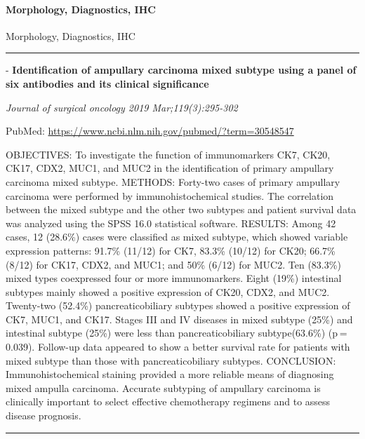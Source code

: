 \documentclass[]{article}
\let\oldparagraph\paragraph
\renewcommand{\paragraph}[1]{\oldparagraph{#1}\mbox{}}
\begin{document}
\hypertarget{morphology-diagnostics-ihc-3}{%
\paragraph{Morphology, Diagnostics,
IHC}\label{morphology-diagnostics-ihc-3}}

Morphology, Diagnostics, IHC

\begin{center}\rule{0.5\linewidth}{\linethickness}\end{center}

 - \textbf{Identification of ampullary carcinoma mixed subtype using a
panel of six antibodies and its clinical significance}

\emph{Journal of surgical oncology 2019 Mar;119(3):295-302}

PubMed: \url{https://www.ncbi.nlm.nih.gov/pubmed/?term=30548547}

OBJECTIVES: To investigate the function of immunomarkers CK7, CK20,
CK17, CDX2, MUC1, and MUC2 in the identification of primary ampullary
carcinoma mixed subtype. METHODS: Forty-two cases of primary ampullary
carcinoma were performed by immunohistochemical studies. The correlation
between the mixed subtype and the other two subtypes and patient
survival data was analyzed using the SPSS 16.0 statistical software.
RESULTS: Among 42 cases, 12 (28.6\%) cases were classified as mixed
subtype, which showed variable expression patterns: 91.7\% (11/12) for
CK7, 83.3\% (10/12) for CK20; 66.7\% (8/12) for CK17, CDX2, and MUC1;
and 50\% (6/12) for MUC2. Ten (83.3\%) mixed types coexpressed four or
more immunomarkers. Eight (19\%) intestinal subtypes mainly showed a
positive expression of CK20, CDX2, and MUC2. Twenty-two (52.4\%)
pancreaticobiliary subtypes showed a positive expression of CK7, MUC1,
and CK17. Stages III and IV diseases in mixed subtype (25\%) and
intestinal subtype (25\%) were less than pancreaticobiliary
subtype(63.6\%) (p = 0.039). Follow-up data appeared to show a better
survival rate for patients with mixed subtype than those with
pancreaticobiliary subtypes. CONCLUSION: Immunohistochemical staining
provided a more reliable means of diagnosing mixed ampulla carcinoma.
Accurate subtyping of ampullary carcinoma is clinically important to
select effective chemotherapy regimens and to assess disease prognosis.

{}

{}

\begin{center}\rule{0.5\linewidth}{\linethickness}\end{center}
\end{document}
